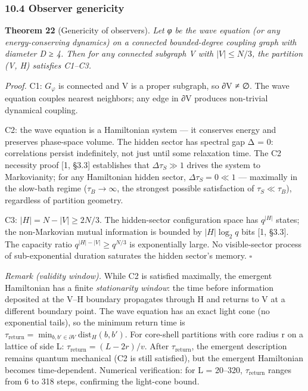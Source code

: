 \documentclass[
  11pt,
]{article}
\begin{document}
\hypertarget{observer-genericity}{%
\subsubsection{10.4 Observer genericity}\label{observer-genericity}}

\textbf{Theorem 22} (Genericity of observers). \emph{Let φ be the wave
equation (or any energy-conserving dynamics) on a connected
bounded-degree coupling graph with diameter D ≥ 4. Then for any
connected subgraph V with \(|V| \leq N/3\), the partition (V, H)
satisfies C1--C3.}

\emph{Proof.} C1: \(G_\varphi\) is connected and V is a proper subgraph,
so ∂V ≠ ∅. The wave equation couples nearest neighbors; any edge in ∂V
produces non-trivial dynamical coupling.

C2: the wave equation is a Hamiltonian system --- it conserves energy
and preserves phase-space volume. The hidden sector has spectral gap Δ =
0: correlations persist indefinitely, not just until some relaxation
time. The C2 necessity proof {[}1, §3.3{]} establishes that
\(\Delta \tau_S \gg 1\) drives the system to Markovianity; for any
Hamiltonian hidden sector, \(\Delta \tau_S = 0 \ll 1\) --- maximally in
the slow-bath regime (\(\tau_B \to \infty\), the strongest possible
satisfaction of \(\tau_S \ll \tau_B\)), regardless of partition
geometry.

C3: \(|H| = N - |V| \geq 2N/3\). The hidden-sector configuration space
has \(q^{|H|}\) states; the non-Markovian mutual information is bounded
by \(|H| \log_2 q\) bits {[}1, §3.3{]}. The capacity ratio
\(q^{|H| - |V|} \geq q^{N/3}\) is exponentially large. No visible-sector
process of sub-exponential duration saturates the hidden sector's
memory. \(\square\)

\emph{Remark (validity window).} While C2 is satisfied maximally, the
emergent Hamiltonian has a finite \emph{stationarity window}: the time
before information deposited at the V--H boundary propagates through H
and returns to V at a different boundary point. The wave equation has an
exact light cone (no exponential tails), so the minimum return time is
\(\tau_{\mathrm{return}} = \min_{b, b' \in \partial V} \mathrm{dist}_H(b, b')\).
For core-shell partitions with core radius r on a lattice of side L:
\(\tau_{\mathrm{return}} = (L - 2r)/v\). After
\(\tau_{\mathrm{return}}\), the emergent description remains quantum
mechanical (C2 is still satisfied), but the emergent Hamiltonian becomes
time-dependent. Numerical verification: for L = 20--320,
\(\tau_{\mathrm{return}}\) ranges from 6 to 318 steps, confirming the
light-cone bound.
\end{document}
